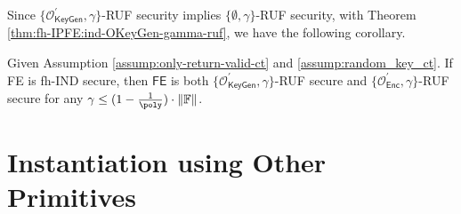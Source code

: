 Since $\{ \mathcal{O}^\prime_{\textsf{KeyGen}}, \gamma \}$-RUF security implies $\{ \emptyset, \gamma \}$-RUF security, with Theorem \ref{thm:fh-IPFE:ind-OKeyGen-gamma-ruf}, we have the following corollary.

\begin{corollary}
\label{cor:fh-IPFE:ind-OKeyGen-OEnc-ruf}
Given Assumption \ref{assump:only-return-valid-ct} and \ref{assump:random_key_ct}. If \textsf{FE} is fh-IND secure, then $\textsf{FE}$ is both $\{ \mathcal{O}^\prime_{\textsf{KeyGen}}, \gamma \}$-RUF secure and $\{ \mathcal{O}^\prime_{\textsf{Enc}}, \gamma \}$-RUF secure for any $\gamma \leq (1 - \frac{1}{\poly}) \cdot \|\mathbb{F}\|$.
\end{corollary}



\newpage


\section{Instantiation using Other Primitives}


